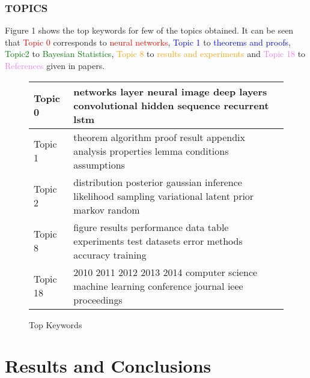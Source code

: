\subsubsection{TOPICS}
Figure 1 shows the top keywords for few of the topics obtained. It can be seen that \textcolor{red}{Topic 0} corresponds to \textcolor{red}{neural networks}, \textcolor{blue}{Topic 1} to \textcolor{blue}{theorems and proofs}, \textcolor{green}{Topic2} to \textcolor{green}{Bayesian Statistics}, \textcolor{orange}{Topic 8} to \textcolor{orange}{results and experiments} and \textcolor{violet}{Topic 18} to \textcolor{violet}{References} given in papers. 
\begin{figure}
 \begin{adjustwidth}{-3cm}{}
\begin{tabular}{ |l | l| } 
 \hline
 Topic 0 & networks layer neural image deep layers convolutional hidden sequence recurrent lstm  \\
 \hline
 Topic 1 & theorem algorithm proof result appendix analysis properties lemma conditions assumptions  \\
 \hline 
Topic 2 & distribution posterior gaussian inference likelihood sampling variational latent prior markov random \\
 \hline
 Topic 8 & figure results performance data table experiments test datasets error methods accuracy training \\
 \hline
 Topic 18 & 2010 2011 2012 2013 2014 computer science machine learning conference journal ieee proceedings  \\
 \hline
\end{tabular}
\end{adjustwidth}
\caption{Top Keywords}
\end{figure}
\section{Results and Conclusions}
